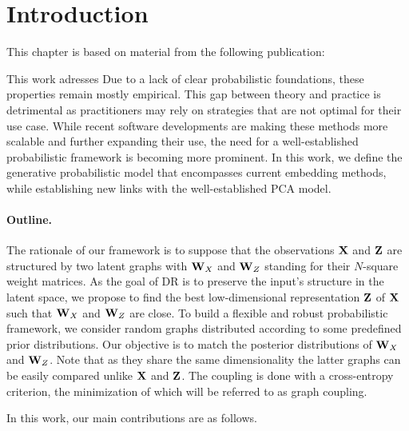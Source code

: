 \section{Introduction}\label{intro}


This chapter is based on material from the following publication:

\begin{mdframed}
\begin{center} 
\end{center}
\end{mdframed}

This work adresses  
Due to a lack of clear probabilistic foundations, these properties remain mostly empirical. This gap between theory and practice is detrimental as practitioners may rely on strategies that are not optimal for their use case.
While recent software developments are making these methods more scalable \cite{chan2018t,pezzotti2019gpgpu,linderman2019fast} and further expanding their use, the need for a well-established probabilistic framework is becoming more prominent.
In this work, we define the generative probabilistic model that encompasses current embedding methods, while establishing new links with the well-established PCA model.

\paragraph{Outline.} 
The rationale of our framework is to suppose that the observations $\mathbf{X}$ and $\mathbf{Z}$ are structured by two latent graphs with $\mathbf{W}_{X}$ and $\mathbf{W}_{Z}$ standing for their $N$-square weight matrices.
As the goal of DR is to preserve the input's structure in the latent space, we propose to find the best low-dimensional representation $\mathbf{Z}$ of $\mathbf{X}$ such that $\mathbf{W}_{X}$ and $\mathbf{W}_{Z}$ are close. To build a flexible and robust probabilistic framework, we consider random graphs distributed according to some predefined prior distributions. Our objective is to match the posterior distributions of $\mathbf{W}_{X}$ and $\mathbf{W}_{Z}$. Note that as they share the same dimensionality the latter graphs can be easily compared unlike $\mathbf{X}$ and $\mathbf{Z}$. The coupling is done with a cross-entropy criterion, the minimization of which will be referred to as graph coupling.

In this work, our main contributions are as follows.

